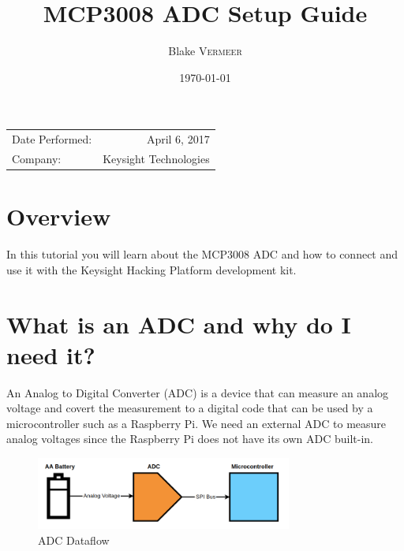 \documentclass{article}
\title{MCP3008 ADC Setup Guide} %
\author{Blake \textsc{Vermeer}} %
\date{\today} %
\begin{document}
\maketitle %

\begin{center}
\begin{tabular}{l r}
Date Performed: & April 6, 2017 \\ %
Company: & Keysight Technologies %
\end{tabular}
\end{center}


\section{Overview}

In this tutorial you will learn about the MCP3008 ADC and how to connect and use it with the Keysight Hacking Platform development kit.


\section{What is an ADC and why do I need it?}

An Analog to Digital Converter (ADC) is a device that can measure an analog voltage and covert the measurement to a digital code that can be used by a microcontroller such as a Raspberry Pi. We need an external ADC to measure analog voltages since the Raspberry Pi does not have its own ADC built-in.

	\begin{figure}[H]
		\centering
		\includegraphics[width=0.75\textwidth]{pics/ADC_Dataflow.png}
		\caption{ADC Dataflow}
		\label{ADC_Dataflow}
	\end{figure}
\end{document}
